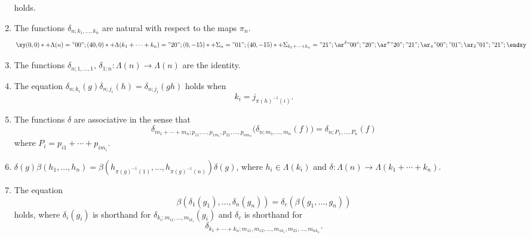 \documentclass{amsbook} %
\numberwithin{section}{chapter}
\begin{document}
\begin{thm}
\begin{enumerate}
\[\]
holds.
\item\label{eq4} The functions $\delta_{n; k_{1}, \ldots, k_{n}}$ are natural with respect to the maps $\pi_{n}$.
\[
\xy
(0,0)*+{\Lambda(n)} ="00";
(40,0)*+{\Lambda(k_{1} + \cdots + k_{n}) } ="20";
(0,-15)*+{\Sigma_{n}  } ="01";
(40,-15)*+{\Sigma_{k_{1} + \cdots + k_{n}} } ="21";
{\ar^{\delta} "00" ; "20"};
{\ar^{\pi} "20" ; "21"};
{\ar_{\pi} "00" ; "01"};
{\ar_{\delta} "01" ; "21"};
\endxy
\]
\item\label{eq5} The functions $\delta_{n; 1, \ldots, 1}, \, \delta_{1;n} : \Lambda(n) \to \Lambda(n)$ are the identity.
\item\label{eq6} The equation $\delta_{n; k_{i}}(g) \delta_{n; j_{i}}(h) = \delta_{n; j_{i}}(gh)$ holds when
\[
k_{i} = j_{\pi(h)^{-1}(i)}.
\]
\item\label{eq7} The functions $\delta$ are associative in the sense that
\[
\delta_{m_1 + \cdots + m_n; p_{11}, \ldots, p_{1m_{1}}, p_{21}, \ldots, p_{nm_{n}}}\big( \delta_{n; m_{1}, \ldots, m_{n}}(f) \big) = \delta_{n; P_{1}, \ldots, P_{n}}(f)
\]
where $P_{i} = p_{i1} + \cdots + p_{im_{i}}$.
\item\label{eq8} $\delta(g) \beta(h_{1}, \ldots, h_{n}) = \beta(h_{\pi(g)^{-1}(1)}, \ldots,  h_{\pi(g)^{-1}(n)}) \delta(g)$, where $h_{i} \in \Lambda(k_{i})$ and $\delta:\Lambda(n) \rightarrow \Lambda(k_{1} + \cdots + k_{n})$.
\item\label{eq9} The equation
\[
\beta(\delta_{1}(g_{1}), \ldots, \delta_{n}(g_{n})) = \delta_{c}(\beta(g_{1}, \ldots, g_{n}))
\]
holds, where $\delta_{i}(g_{i})$ is shorthand for $\delta_{k_{i}; m_{i1}, \ldots, m_{ik_{i}}}(g_{i})$ and $\delta_{c}$ is shorthand for
\[
\delta_{k_{1}+\cdots + k_{n}; m_{11}, m_{12}, \ldots, m_{1k_{1}}, m_{21}, \ldots, m_{nk_{n}}}.
\]
\end{enumerate}
\end{thm}
\end{document}
